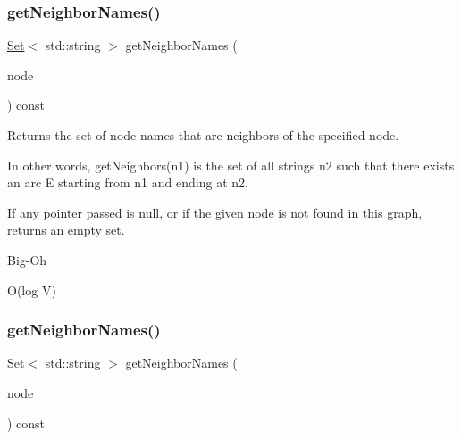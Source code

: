 \subsubsection{\texorpdfstring{get\+Neighbor\+Names()}{getNeighborNames()}\hspace{0.1cm}{\footnotesize\ttfamily [1/2]}}
{\footnotesize\ttfamily \mbox{\hyperlink{classstanfordcpplib_1_1collections_1_1GenericSet}{Set}}$<$ std\+::string $>$ get\+Neighbor\+Names (\begin{DoxyParamCaption}\item[{\mbox{\hyperlink{classVertexGen}{Vertex\+Gen}}$<$ V, E $>$  $\ast$}]{node }\end{DoxyParamCaption}) const\hspace{0.3cm}{\ttfamily [inherited]}}



Returns the set of node names that are neighbors of the specified node. 

In other words, get\+Neighbors(n1) is the set of all strings n2 such that there exists an arc E starting from n1 and ending at n2.

If any pointer passed is null, or if the given node is not found in this graph, returns an empty set. \begin{DoxyRefDesc}{Big-\/\+Oh}
\item[\mbox{\hyperlink{BigOh__BigOh000071}{Big-\/\+Oh}}]O(log V) \end{DoxyRefDesc}
\mbox{\label{classGraph_a6175b4d672266465dd34e070c7710b34}} 
\subsubsection{\texorpdfstring{get\+Neighbor\+Names()}{getNeighborNames()}\hspace{0.1cm}{\footnotesize\ttfamily [2/2]}}
{\footnotesize\ttfamily \mbox{\hyperlink{classstanfordcpplib_1_1collections_1_1GenericSet}{Set}}$<$ std\+::string $>$ get\+Neighbor\+Names (\begin{DoxyParamCaption}\item[{const std\+::string \&}]{node }\end{DoxyParamCaption}) const\hspace{0.3cm}{\ttfamily [inherited]}}



